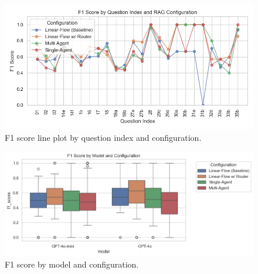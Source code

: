                 \begin{figure}[H]
                    \centering
                    \includegraphics[scale=0.75]{images_exp2/f1_lineplot_by_question_index_and_configuration.png}
                    \caption{F1 score line plot by question index and configuration.}
                    \label{fig:f1_lineplot_by_question_index_and_configuration}
                \end{figure}


                \begin{figure}[H]
                    \centering
                    \includegraphics[scale=0.75]{images_exp2/f1_score_by_model_and_configuration.png}
                    \caption{F1 score by model and configuration.}
                    \label{fig:f1_score_by_model_and_configuration}
                \end{figure}

